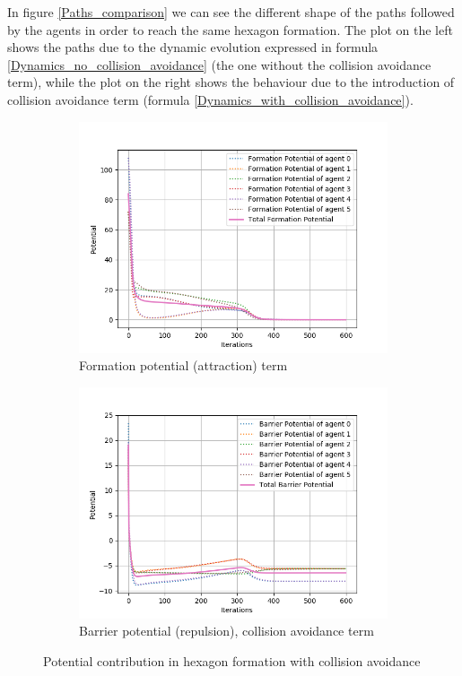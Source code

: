 \documentclass[a4paper,11pt,oneside]{book}
\begin{document}
In figure \ref{Paths_comparison} we can see the different shape of the paths followed by the agents in order to reach the same hexagon formation. The plot on the left shows the paths due to the dynamic evolution expressed in formula \ref{Dynamics_no_collision_avoidance} (the one without the collision avoidance term), while the plot on the right shows the behaviour due to the introduction of collision avoidance term (formula \ref{Dynamics_with_collision_avoidance}).

\begin{figure}[h]
\centering
	\begin{subfigure}{0.49\textwidth}	
	\includegraphics[scale=0.42]{Formation_potential_hexagon_collision}
	\caption{Formation potential (attraction) term}
	\end{subfigure}
\hfill
	\begin{subfigure}{0.49\textwidth}	
	\includegraphics[scale=0.42]{Barrier_potential_hexagon_collision}
	\caption{Barrier potential (repulsion), collision avoidance term}
	\end{subfigure}
\caption{Potential contribution in hexagon formation with collision avoidance}
\label{Potentials_with_collision}
\end{figure}
\end{document}
